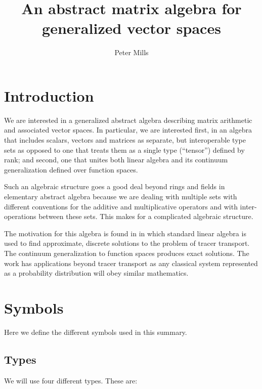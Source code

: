 \documentclass{article}
\begin{document}
\title{An abstract matrix algebra for generalized vector spaces}
\author{Peter Mills}

\maketitle

\tableofcontents

\section{Introduction}

We are interested in a generalized abstract algebra describing matrix
arithmetic and associated vector spaces.
In particular, we are interested first, in an algebra that includes scalars,
vectors and matrices as separate, but interoperable type sets as opposed to one
that treats them as a single type (``tensor'') defined by rank; and second,
one that unites both linear algebra and its continuum generalization
defined over function spaces.

Such an algebraic structure goes a good deal beyond rings and fields
in elementary abstract algebra because we are dealing with multiple sets
with different conventions for the additive and multiplicative operators
and with inter-operations between these sets.
This makes for a complicated algebraic structure.

The motivation for this algebra is found in \citet{Mills2015} in which 
standard linear algebra is used to find approximate, discrete solutions to
the problem of tracer transport.
The continuum generalization to function spaces produces exact solutions.
The work has applications beyond tracer transport as any
classical system represented as a probability distribution will obey similar
mathematics.


\section{Symbols}

Here we define the different symbols used in this summary.

\subsection{Types}

We will use four different types. These are:
\end{document}
